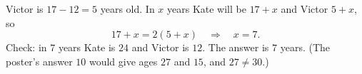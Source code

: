Victor is $17-12=5$ years old. In $x$ years Kate will be $17+x$ and Victor $5+x$, so
\[
17+x=2(5+x)\quad\Longrightarrow\quad x=7 .
\]
Check: in $7$ years Kate is $24$ and Victor is $12$. The answer is $\boxed{7}$ years. (The poster's answer $10$ would give ages $27$ and $15$, and $27\ne30$.)
